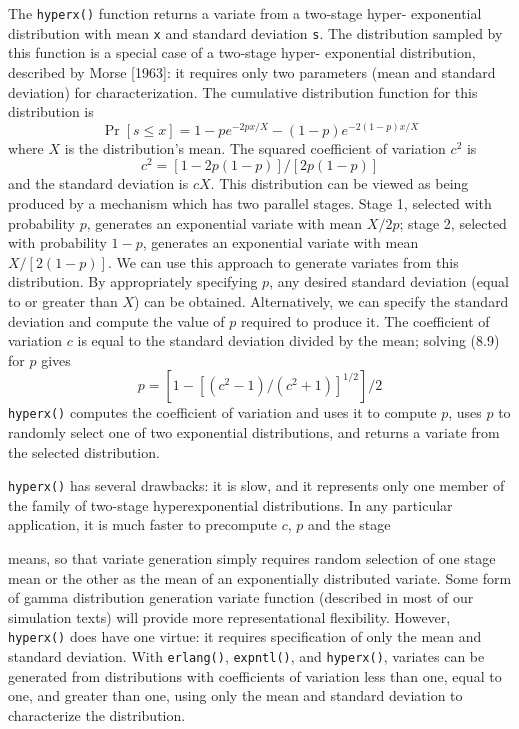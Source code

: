 The \texttt{hyperx()} function returns a variate from a two-stage hyper-
exponential distribution with mean \texttt{x} and standard deviation \texttt{s}. The distribution
sampled by this function is a special case of a two-stage hyper-
exponential distribution, described by Morse [1963]: it requires only two
parameters (mean and standard deviation) for characterization. The
cumulative distribution function for this distribution is
\begin{equation}
\Pr[s\le x]=1-pe^{-2px/X}-(1-p)e^{-2(1-p)x/X}
\end{equation}
where $X$ is the distribution's mean. The squared coefficient of variation $c^2$ is
\begin{equation}
c^2=[1-2p(1-p)]/[2p(1-p)]
\end{equation}
and the standard deviation is $cX$. This distribution can be viewed as being
produced by a mechanism which has two parallel stages. Stage 1, selected
with probability $p$, generates an exponential variate with mean $X/2p$; stage
2, selected with probability $1-p$, generates an exponential variate with
mean $X/[2(1-p)]$. We can use this approach to generate variates from this
distribution. By appropriately specifying $p$, any desired standard deviation
(equal to or greater than $X$) can be obtained. Alternatively, we can specify
the standard deviation and compute the value of $p$ required to produce it.
The coefficient of variation $c$ is equal to the standard deviation divided by
the mean; solving (8.9) for $p$ gives
\begin{equation}
p=[1-[(c^2-1)/(c^2+1)]^{1/2}]/2
\end{equation}
\texttt{hyperx()} computes the coefficient of variation and uses it to compute $p$, uses
$p$ to randomly select one of two exponential distributions, and returns a
variate from the selected distribution.

\texttt{hyperx()} has several drawbacks: it is slow, and it represents only one
member of the family of two-stage hyperexponential distributions. In any
particular application, it is much faster to precompute $c$, $p$ and the stage

\noindent means, so that variate generation simply requires random selection of one
stage mean or the other as the mean of an exponentially distributed variate.
Some form of gamma distribution generation variate function (described in
most of our simulation texts) will provide more representational flexibility.
However, \texttt{hyperx()} does have one virtue: it requires specification of only
the mean and standard deviation. With \texttt{erlang()}, \texttt{expntl()}, and
\texttt{hyperx()}, variates can be generated from distributions with coefficients of
variation less than one, equal to one, and greater than one, using only the
mean and standard deviation to characterize the distribution.

